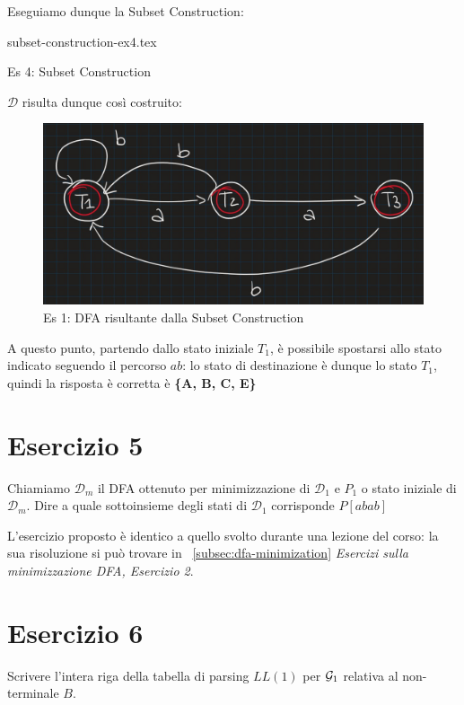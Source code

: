 \documentclass[class=book, crop=false, oneside, 12pt]{standalone}
\begin{document}
Eseguiamo dunque la Subset Construction:

\begin{table}[H]
    \centering
    {subset-construction-ex4.tex}
    \caption{Es 4: Subset Construction}
    \label{tab:subset-construction-ex4}
\end{table}

\(\mathcal{D}\) risulta dunque così costruito:

\begin{figure}[H]
	\centering
    \includegraphics[width=.8\textwidth]{sc-ex4.jpg}
    \caption{Es 1: DFA risultante dalla Subset Construction}
    \label{fig:sc-ex4}
\end{figure}

A questo punto, partendo dallo stato iniziale \(T_1\), è possibile spostarsi allo stato indicato seguendo il percorso \(ab\): lo stato di destinazione è dunque lo stato \(T_1\), quindi la risposta è corretta è \textbf{\{A, B, C, E\}}

\section*{Esercizio 5}

Chiamiamo \(\mathcal{D}_m\) il  DFA  ottenuto  per  minimizzazione  di \(\mathcal{D}_1\) e \(P_1\) o  stato  iniziale  di \(\mathcal{D}_m\). Dire a quale sottoinsieme degli stati di \(\mathcal{D}_1\) corrisponde \(P[abab]\)

L'esercizio proposto è identico a quello svolto durante una lezione del corso: la sua risoluzione si può trovare in ~\ref{subsec:dfa-minimization} \emph{Esercizi sulla minimizzazione DFA, Esercizio 2}.

\section*{Esercizio 6}

Scrivere l’intera riga della tabella di parsing \(LL(1)\) per \(\mathcal{G}_1\) relativa al non-terminale \(B\).
\end{document}
